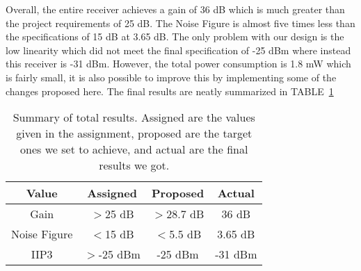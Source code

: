 Overall, the entire receiver achieves a gain of 36 dB which is much greater than the project requirements of 25 dB. The Noise Figure is almost five times less than the specifications of 15 dB  at 3.65 dB. The only problem with our design is the low linearity which did not meet the final specification of -25 dBm where instead this receiver is -31 dBm. However, the total power consumption is 1.8 mW which is fairly small, it is also possible to improve this by implementing some of the changes proposed here. The final results are neatly summarized in TABLE~\ref{tab:totalresults}


\begin{table}[h]
\begin{center}
	\begin{tabular}{ c | c | c | c  }
		Value & Assigned & Proposed & Actual \\ \hline
		Gain & $>$25 dB & $>$28.7 dB & 36 dB \\ \hline
		Noise Figure & $<$15 dB & $<$5.5 dB & 3.65 dB \\ \hline
		IIP3 & $>$-25 dBm & -25 dBm & -31 dBm \\ 
	\end{tabular}

\end{center}
\caption{Summary of total results. Assigned are the values given in the assignment, proposed are the target ones we set to achieve, and actual are the final results we got.}
\label{tab:totalresults}
\end{table}
